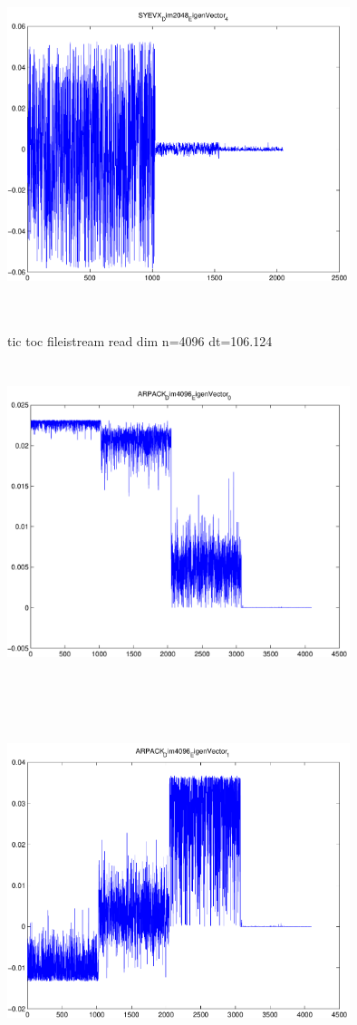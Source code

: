 \documentclass[9pt]{article}
\theoremstyle{plain}
\theoremstyle{definition}
\theoremstyle{remark}
\numberwithin{equation}{section}
\begin{document}
\includegraphics[width=10.0cm,height=10.0cm]{SYEVX_Dim2048_EigenVector_4.pdf}

tic toc fileistream read dim n=4096 dt=106.124
\includegraphics[width=10.0cm,height=10.0cm]{ARPACK_Dim4096_EigenVector_0.pdf}

\includegraphics[width=10.0cm,height=10.0cm]{ARPACK_Dim4096_EigenVector_1.pdf}
\end{document}
